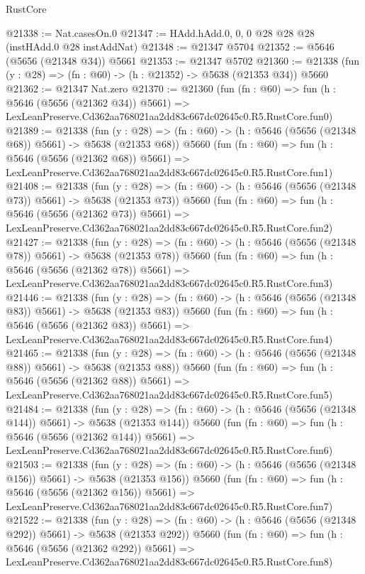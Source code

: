 \begin{lexlean}{RustCore}
\begin{coremodule}
@21338 := Nat.casesOn.{0}
@21347 := HAdd.hAdd.{0, 0, 0} @28 @28 @28 (instHAdd.{0} @28 instAddNat)
@21348 := @21347 @5704
@21352 := @5646 (@5656 (@21348 @34)) @5661
@21353 := @21347 @5702
@21360 := @21338 (fun (y : @28) => (fn : @60) -> (h : @21352) -> @5638 (@21353 @34)) @5660
@21362 := @21347 Nat.zero
@21370 := @21360
    (fun (fn : @60) =>
    fun (h : @5646 (@5656 (@21362 @34)) @5661) =>
    LexLeanPreserve.Cd362aa768021aa2dd83c667dc02645c0.R5.RustCore.fun0)
@21389 := @21338
    (fun (y : @28) => (fn : @60) -> (h : @5646 (@5656 (@21348 @68)) @5661) -> @5638 (@21353 @68))
    @5660
    (fun (fn : @60) =>
    fun (h : @5646 (@5656 (@21362 @68)) @5661) =>
    LexLeanPreserve.Cd362aa768021aa2dd83c667dc02645c0.R5.RustCore.fun1)
@21408 := @21338
    (fun (y : @28) => (fn : @60) -> (h : @5646 (@5656 (@21348 @73)) @5661) -> @5638 (@21353 @73))
    @5660
    (fun (fn : @60) =>
    fun (h : @5646 (@5656 (@21362 @73)) @5661) =>
    LexLeanPreserve.Cd362aa768021aa2dd83c667dc02645c0.R5.RustCore.fun2)
@21427 := @21338
    (fun (y : @28) => (fn : @60) -> (h : @5646 (@5656 (@21348 @78)) @5661) -> @5638 (@21353 @78))
    @5660
    (fun (fn : @60) =>
    fun (h : @5646 (@5656 (@21362 @78)) @5661) =>
    LexLeanPreserve.Cd362aa768021aa2dd83c667dc02645c0.R5.RustCore.fun3)
@21446 := @21338
    (fun (y : @28) => (fn : @60) -> (h : @5646 (@5656 (@21348 @83)) @5661) -> @5638 (@21353 @83))
    @5660
    (fun (fn : @60) =>
    fun (h : @5646 (@5656 (@21362 @83)) @5661) =>
    LexLeanPreserve.Cd362aa768021aa2dd83c667dc02645c0.R5.RustCore.fun4)
@21465 := @21338
    (fun (y : @28) => (fn : @60) -> (h : @5646 (@5656 (@21348 @88)) @5661) -> @5638 (@21353 @88))
    @5660
    (fun (fn : @60) =>
    fun (h : @5646 (@5656 (@21362 @88)) @5661) =>
    LexLeanPreserve.Cd362aa768021aa2dd83c667dc02645c0.R5.RustCore.fun5)
@21484 := @21338
    (fun (y : @28) => (fn : @60) -> (h : @5646 (@5656 (@21348 @144)) @5661) -> @5638 (@21353 @144))
    @5660
    (fun (fn : @60) =>
    fun (h : @5646 (@5656 (@21362 @144)) @5661) =>
    LexLeanPreserve.Cd362aa768021aa2dd83c667dc02645c0.R5.RustCore.fun6)
@21503 := @21338
    (fun (y : @28) => (fn : @60) -> (h : @5646 (@5656 (@21348 @156)) @5661) -> @5638 (@21353 @156))
    @5660
    (fun (fn : @60) =>
    fun (h : @5646 (@5656 (@21362 @156)) @5661) =>
    LexLeanPreserve.Cd362aa768021aa2dd83c667dc02645c0.R5.RustCore.fun7)
@21522 := @21338
    (fun (y : @28) => (fn : @60) -> (h : @5646 (@5656 (@21348 @292)) @5661) -> @5638 (@21353 @292))
    @5660
    (fun (fn : @60) =>
    fun (h : @5646 (@5656 (@21362 @292)) @5661) =>
    LexLeanPreserve.Cd362aa768021aa2dd83c667dc02645c0.R5.RustCore.fun8)

\end{coremodule}
\end{lexlean}
